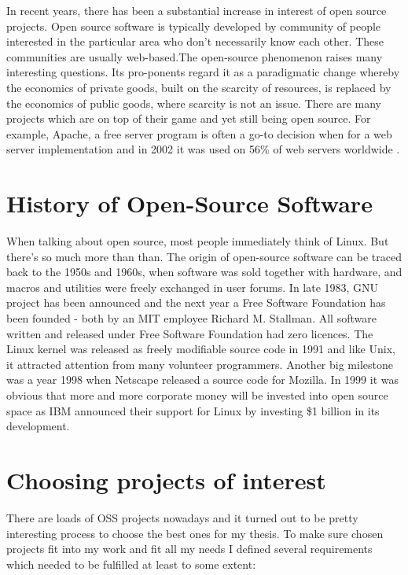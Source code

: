 In recent years, there has been a substantial increase in interest of open source projects. Open source software is typically developed by community of people interested in the particular area who don't necessarily know each other. These communities are usually web-based.The open-source phenomenon raises many interesting questions. Its pro-ponents regard it as a paradigmatic change whereby the economics of private goods, built on the scarcity of resources, is replaced by the economics of public goods, where scarcity is not an issue. \cite{alexander2002working} There are many projects which are on top of their game and yet still being open source. For example, Apache, a free server program is often a go-to decision when for a web server implementation and in 2002 it was used on 56\% of web servers worldwide \cite{lerner2001open}.

\section{History of Open-Source Software}
When talking about open source, most people immediately think of Linux. But there's so much more than than. The origin of open-source software can be traced back to the 1950s and 1960s, when software was sold together with hardware, and macros and utilities were freely exchanged in user forums. \cite{alexander2002working} In late 1983, GNU project has been announced and the next year a Free Software Foundation has been founded - both by an MIT employee Richard M. Stallman. All software written and released under Free Software Foundation had zero licences. The Linux kernel was released as freely modifiable source code in 1991 and like Unix, it attracted attention from many volunteer programmers. Another big milestone was a year 1998 when Netscape released a source code for Mozilla. In 1999 it was obvious that more and more corporate money will be invested into open source space as IBM announced their support for Linux by investing \$1 billion in its development.

\section{Choosing projects of interest}
There are loads of OSS projects nowadays and it turned out to be pretty interesting process to choose the best ones for my thesis. To make sure chosen projects fit into my work and fit  all my needs I defined several requirements which needed to be fulfilled at least to some extent:

